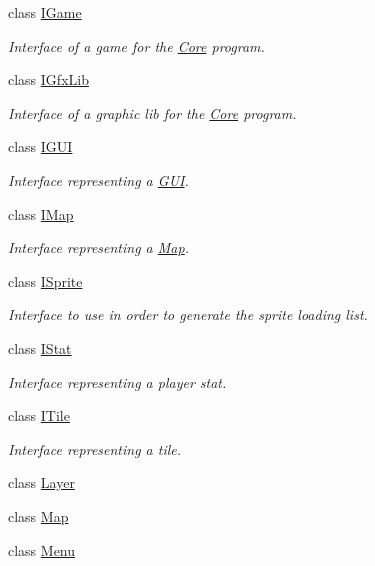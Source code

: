 \begin{DoxyCompactItemize}
class \hyperlink{classarcade_1_1_i_game}{I\+Game}
\begin{DoxyCompactList}\small\item\em Interface of a game for the \hyperlink{classarcade_1_1_core}{Core} program. \end{DoxyCompactList}\item 
class \hyperlink{classarcade_1_1_i_gfx_lib}{I\+Gfx\+Lib}
\begin{DoxyCompactList}\small\item\em Interface of a graphic lib for the \hyperlink{classarcade_1_1_core}{Core} program. \end{DoxyCompactList}\item 
class \hyperlink{classarcade_1_1_i_g_u_i}{I\+G\+UI}
\begin{DoxyCompactList}\small\item\em Interface representing a \hyperlink{classarcade_1_1_g_u_i}{G\+UI}. \end{DoxyCompactList}\item 
class \hyperlink{classarcade_1_1_i_map}{I\+Map}
\begin{DoxyCompactList}\small\item\em Interface representing a \hyperlink{classarcade_1_1_map}{Map}. \end{DoxyCompactList}\item 
class \hyperlink{classarcade_1_1_i_sprite}{I\+Sprite}
\begin{DoxyCompactList}\small\item\em Interface to use in order to generate the sprite loading list. \end{DoxyCompactList}\item 
class \hyperlink{classarcade_1_1_i_stat}{I\+Stat}
\begin{DoxyCompactList}\small\item\em Interface representing a player stat. \end{DoxyCompactList}\item 
class \hyperlink{classarcade_1_1_i_tile}{I\+Tile}
\begin{DoxyCompactList}\small\item\em Interface representing a tile. \end{DoxyCompactList}\item 
class \hyperlink{classarcade_1_1_layer}{Layer}
\item 
class \hyperlink{classarcade_1_1_map}{Map}
\item 
class \hyperlink{classarcade_1_1_menu}{Menu}
\item 

\end{DoxyCompactItemize}

